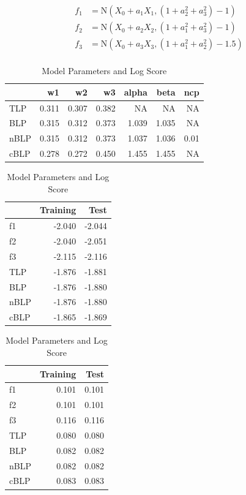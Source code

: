 \documentclass[]{article}
\begin{document}
\[
\begin{aligned}
f_1&=\text{N}(X_0+a_1X_1,(1+a^2_2+a^2_3)-1)\\
f_2&=\text{N}(X_0+a_2X_2,(1+a^2_1+a^2_3)-1)\\
f_3&=\text{N}(X_0+a_3X_3,(1+a^2_1+a^2_2)-1.5)\\
\end{aligned}
\]

\begin{table}[!h]
\caption{\label{tab:unnamed-chunk-7}Model Parameters and Log Score}

\centering
\begin{tabular}[t]{lrrrrrr}
\toprule
  & w1 & w2 & w3 & alpha & beta & ncp\\
\midrule
\rowcolor{gray!6}  TLP & 0.311 & 0.307 & 0.382 & NA & NA & NA\\
BLP & 0.315 & 0.312 & 0.373 & 1.039 & 1.035 & NA\\
\rowcolor{gray!6}  nBLP & 0.315 & 0.312 & 0.373 & 1.037 & 1.036 & 0.01\\
cBLP & 0.278 & 0.272 & 0.450 & 1.455 & 1.455 & NA\\
\bottomrule
\end{tabular}
\centering
\begin{tabular}[t]{lrr}
\toprule
\rowcolor{gray!6}    & Training & \vphantom{1} Test\\
\midrule
f1 & -2.040 & -2.044\\
\rowcolor{gray!6}  f2 & -2.040 & -2.051\\
f3 & -2.115 & -2.116\\
\rowcolor{gray!6}  TLP & -1.876 & -1.881\\
BLP & -1.876 & -1.880\\
\addlinespace
\rowcolor{gray!6}  nBLP & -1.876 & -1.880\\
cBLP & -1.865 & -1.869\\
\bottomrule
\end{tabular}
\centering
\begin{tabular}[t]{lrr}
\toprule
\rowcolor{gray!6}    & Training & Test\\
\midrule
f1 & 0.101 & 0.101\\
\rowcolor{gray!6}  f2 & 0.101 & 0.101\\
f3 & 0.116 & 0.116\\
\rowcolor{gray!6}  TLP & 0.080 & 0.080\\
BLP & 0.082 & 0.082\\
\addlinespace
\rowcolor{gray!6}  nBLP & 0.082 & 0.082\\
cBLP & 0.083 & 0.083\\
\bottomrule
\end{tabular}
\end{table}
\end{document}
